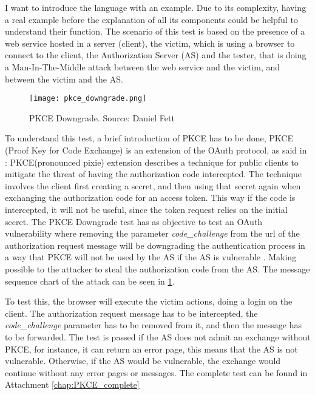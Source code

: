 I want to introduce the language with an example. Due to its complexity, having a real example before the explanation of all its components could be helpful to understand their function.
The scenario of this test is based on the presence of a web service hosted in a server (client), the victim, which is using a browser to connect to the client, the Authorization Server (AS) and the tester, that is doing a Man-In-The-Middle attack between the web service and the victim, and between the victim and the AS.
\begin{figure}
    \texttt{[image: pkce\_downgrade.png]}
    \caption{PKCE Downgrade. Source: Daniel Fett \cite{pkce_msc_image}}
    \label{fig:pkce_downgrade}
\end{figure}

To understand this test, a brief introduction of \gls{PKCE} has to be done, \gls{PKCE} (Proof Key for Code Exchange) is an extension of the \gls{OAuth} protocol, as said in \cite{pkce_explanation}: \gls{PKCE}(pronounced pixie) extension describes a technique for public clients to mitigate the threat of having the authorization code intercepted. The technique involves the client first creating a secret, and then using that secret again when exchanging the authorization code for an access token. This way if the code is intercepted, it will not be useful, since the token request relies on the initial secret. 
The \gls{PKCE} Downgrade test has as objective to test an \gls{OAuth} vulnerability where removing the parameter \textit{code\_challenge} from the url of the authorization request message will be downgrading the authentication process in a way that \gls{PKCE} will not be used by the AS if the AS is vulnerable \cite{pkce_downgrade}. Making possible to the attacker to steal the authorization code from the AS. The message sequence chart of the attack can be seen in \ref{fig:pkce_downgrade}.

To test this, the browser will execute the victim actions, doing a login on the client. The authorization request message has to be intercepted, the \textit{code\_challenge} parameter has to be removed from it, and then the message has to be forwarded. The test is passed if the AS does not admit an exchange without PKCE, for instance, it can return an error page, this means that the AS is not vulnerable. Otherwise, if the AS would be vulnerable, the exchange would continue without any error pages or messages.
The complete test can be found in Attachment \ref{chap:PKCE_complete}

